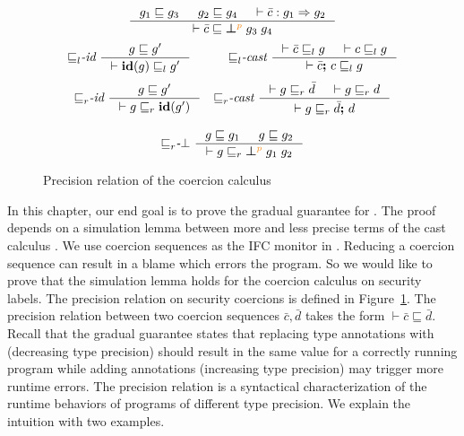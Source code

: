 \begin{figure}[tbp]
{\begin{gather*}
    \inference{g_1 \sqsubseteq g_3 & g_2 \sqsubseteq g_4 & \vdash \bar{c} : g_1 \Rightarrow g_2}
              {\vdash \bar{c} \sqsubseteq \err{g_3}{g_4}{p}}
  \end{gather*}}
  {\small
  \begin{gather*}
    {\sqsubseteq}_l\textit{-id} ~
    \inference{g \sqsubseteq g'}
              {\vdash \id{g} \sqsubseteq_l g'}
    \qquad\quad
    {\sqsubseteq}_l\textit{-cast} ~
    \inference{\vdash \bar{c} \sqsubseteq_l g & \vdash c \sqsubseteq_l g}
              {\vdash \bar{c} \seq c \sqsubseteq_l g}
  \end{gather*}}
 {\small
  \begin{gather*}
    {\sqsubseteq}_r\textit{-id} ~
    \inference{g \sqsubseteq g'}
              {\vdash g \sqsubseteq_r \id{g'}}
    \quad
    {\sqsubseteq}_r\textit{-cast} ~
    \inference{\vdash g \sqsubseteq_r \bar{d} & \vdash g \sqsubseteq_r d}
              {\vdash g \sqsubseteq_r \bar{d} \seq d}
    \\[2ex]
    {\sqsubseteq}_r\textit{-}\bot ~
    \inference{g \sqsubseteq g_1 & g \sqsubseteq g_2}
              {\vdash g \sqsubseteq_r \err{g_1}{g_2}{p}}
  \end{gather*}}
  \caption{Precision relation of the coercion calculus}
  \label{fig:cexpr-prec}
\end{figure}

In this chapter, our end goal is to prove the gradual guarantee for \Surface.
The proof depends on a simulation lemma between more and less precise terms of
the cast calculus \CC . We use coercion sequences as the IFC monitor in \CC.
Reducing a coercion sequence can result in a blame which errors the program. So
we would like to prove that the simulation lemma holds for the coercion calculus
on security labels.
%
The precision relation on security coercions is defined in
Figure~\ref{fig:cexpr-prec}. The precision relation between two coercion
sequences $\bar{c},\bar{d}$ takes the form $\vdash \bar{c} \sqsubseteq \bar{d}$.
Recall that the gradual guarantee states that replacing type annotations with
\unk (decreasing type precision) should result in the same value for a correctly
running program while adding annotations (increasing type precision) may trigger
more runtime errors. The precision relation is a syntactical characterization of
the runtime behaviors of programs of different type precision. We explain the
intuition with two examples.

